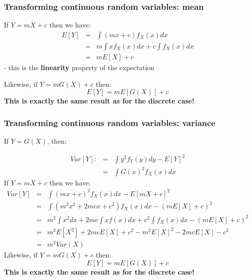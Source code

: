 \documentclass[t,8pt]{beamer}%
\begin{document}

\begin{frame}
	\frametitle{Transforming continuous random variables: mean}
	If $Y=mX+c$ then we have:
	\begin{eqnarray*}
		E[Y]&=&\int (mx+c)f_X(x)dx\\
		&=&m\int xf_X(x)dx+c\int f_X(x)dx\\
		&=&mE[X]+c
	\end{eqnarray*}
	- this is the {\bf linearity} property of the expectation \par
	Likewise, if $Y=mG(X)+c$ then:
	$$E[Y]=mE[G(X)]+c$$
    {\bf This is exactly the same result as for the discrete case!}
\end{frame}

\begin{frame}
	\frametitle{Transforming continuous random variables: variance}
	If $Y=G(X)$, then: \par
	\begin{eqnarray*}
		Var[Y]:&=&\int y^2f_Y(y)dy-E[Y]^2\\
		&=&\int G(x)^2f_X(x)dx
	\end{eqnarray*}
	If $Y=mX+c$ then we have:
	\begin{eqnarray*}
		Var[Y]&=&\int (mx+c)^2f_X(x)dx-E[mX+c]^2\\
		&=&\int (m^2x^2+2mcx+c^2)f_X(x)dx-(mE[X]+c)^2\\
		&=&m^2\int x^2dx+2mc\int xf(x)dx+c^2\int f_X(x)dx-(mE[X]+c)^2\\
            &=&m^2E[X^2]+2mcE[X]+c^2-m^2E[X]^2-2mcE[X]-c^2\\
            &=&m^2Var(X)
	\end{eqnarray*}
	Likewise, if $Y=mG(X)+c$ then:
	$$E[Y]=mE[G(X)]+c$$
    {\bf This is exactly the same result as for the discrete case!}
\end{frame}
\end{document}
